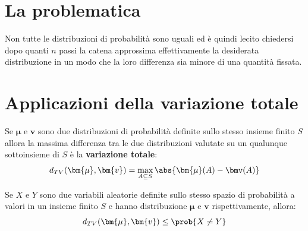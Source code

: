 \documentclass[\main/main.tex]{subfiles}
\begin{document}
\section{La problematica}
Non tutte le distribuzioni di probabilità sono uguali ed è quindi lecito chiedersi dopo quanti \(n\) passi la catena approssima effettivamente la desiderata distribuzione in un modo che la loro differenza sia minore di una quantità fissata.

\section{Applicazioni della variazione totale}
\begin{theorem}
  Se \(\bm{\mu} \) e \(\bm{v}\) sono due distribuzioni di probabilità definite sullo stesso insieme finito \(S\) allora la massima differenza tra le due distribuzioni valutate su un qualunque sottoinsieme di \(S\) è la \textbf{variazione totale}:
  \[
    d_{TV}(\bm{\mu}, \bm{v}) = \max_{A \subseteq S}\abs{\bm{\mu}(A) - \bmv(A)}
  \]
\end{theorem}

\begin{theorem}
  Se \(X\) e \(Y\) sono due variabili aleatorie definite sullo stesso spazio di probabilità a valori in un insieme finito \(S\) e hanno distribuzione \(\bm{\mu} \) e \(\bm{v}\) rispettivamente, allora:
  \[
    d_{TV}(\bm{\mu}, \bm{v}) \leq \prob{X \neq Y}
  \]
\end{theorem}
\clearpage
\end{document}
